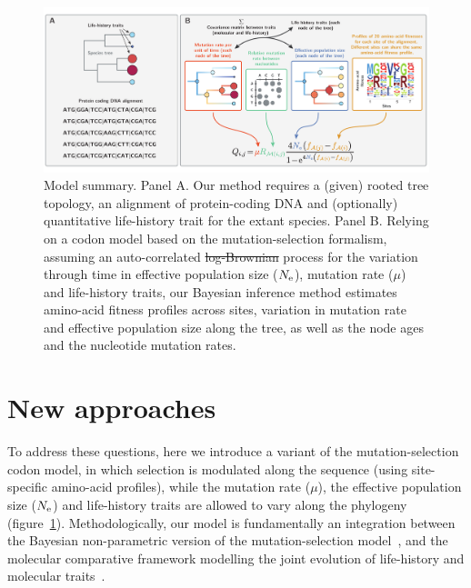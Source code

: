 \documentclass{article}
\providecommand{\DIFaddtex}[1]{{\protect\color{blue}\uwave{#1}}} %
\providecommand{\DIFdeltex}[1]{{\protect\color{red}\sout{#1}}}                      %
\providecommand{\DIFaddFL}[1]{\DIFadd{#1}} %
\providecommand{\DIFdelFL}[1]{\DIFdel{#1}} %
\providecommand{\DIFaddbeginFL}{} %
\providecommand{\DIFaddendFL}{} %
\providecommand{\DIFdelbeginFL}{} %
\providecommand{\DIFdelendFL}{} %
\providecommand{\DIFadd}[1]{\texorpdfstring{\DIFaddtex{#1}}{#1}} %
\providecommand{\DIFdel}[1]{\texorpdfstring{\DIFdeltex{#1}}{}} %
\begin{document}
    \begin{figure}[t]
        \begin{center}
            \includegraphics[width=\textwidth] {model_summary.pdf}
        \end{center}
        \caption[Model summary]{
            Model summary.
            Panel A.
            Our method requires a (given) rooted tree topology, an alignment of protein-coding DNA and (optionally) quantitative life-history trait for the extant species.
            Panel B.
            Relying on a codon model based on the mutation-selection formalism, assuming an auto-correlated \DIFdelbeginFL \DIFdelFL{log-Brownian }\DIFdelendFL \DIFaddbeginFL \DIFaddFL{geometric Brownian }\DIFaddendFL process for the variation through time in effective population size ($N_{\text{e}}$), mutation rate ($\mu$) and life-history traits, our Bayesian inference method estimates amino-acid fitness profiles across sites, variation in mutation rate and effective population size along the tree, as well as the node ages and the nucleotide mutation rates.}
        \label{fig:modelSummary}
    \end{figure}

    \section{New approaches}
    \label{sec:NewApproaches}
    To address these questions, here we introduce a variant of the mutation-selection {codon} model, in which selection is modulated along the sequence (using site-specific amino-acid profiles), while the mutation rate ($\mu$), the {effective population size} ($N_{\text{e}}$) and life-history traits are allowed to vary along the phylogeny (figure~\ref{fig:modelSummary}).
    Methodologically, our model is fundamentally an integration between the Bayesian non-parametric version of the \citet{Halpern1998} mutation-selection model~\citep{Rodrigue2014}, and the molecular comparative framework modelling the joint evolution of life-history and molecular traits~\citep{Lartillot2011}.
\end{document}
